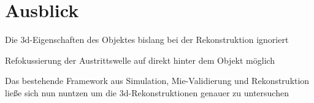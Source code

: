 \chapter{Ausblick}
Die 3d-Eigenschaften des Objektes bislang bei der Rekonstruktion ignoriert

Refokussierung der Austrittswelle auf direkt hinter dem Objekt möglich

Das bestehende Framework aus Simulation, Mie-Validierung und Rekonstruktion ließe sich nun nuntzen um die 3d-Rekonstruktionen genauer zu untersuchen
